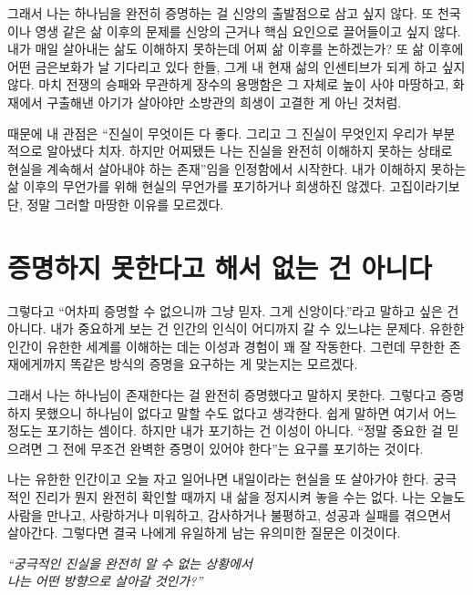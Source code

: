 \documentclass[11pt]{article}
\begin{document}
그래서 나는 하나님을 완전히 증명하는 걸 신앙의 출발점으로 삼고 싶지 않다. 또
천국이나 영생 같은 삶 이후의 문제를 신앙의 근거나 핵심 요인으로 끌어들이고
싶지 않다. 내가 매일 살아내는 삶도 이해하지 못하는데 어찌 삶 이후를 논하겠는가?
또 삶 이후에 어떤 금은보화가 날 기다리고 있다 한들, 그게 내 현재 삶의
인센티브가 되게 하고 싶지 않다. 마치 전쟁의 승패와 무관하게 장수의 용맹함은 그
자체로 높이 사야 마땅하고, 화재에서 구출해낸 아기가 살아야만 소방관의 희생이
고결한 게 아닌 것처럼.

때문에 내 관점은 “진실이 무엇이든 다 좋다. 그리고 그 진실이 무엇인지 우리가
부분적으로 알아냈다 치자. 하지만 어찌됐든 나는 진실을 완전히 이해하지 못하는
상태로 현실을 계속해서 살아내야 하는 존재”임을 인정함에서 시작한다. 내가
이해하지 못하는 삶 이후의 무언가를 위해 현실의 무언가를 포기하거나 희생하진
않겠다. 고집이라기보단, 정말 그러할 마땅한 이유를 모르겠다.

\section{증명하지 못한다고 해서 없는 건 아니다}

그렇다고 “어차피 증명할 수 없으니까 그냥 믿자. 그게 신앙이다.”라고 말하고 싶은
건 아니다. 내가 중요하게 보는 건 인간의 인식이 어디까지 갈 수 있느냐는 문제다.
유한한 인간이 유한한 세계를 이해하는 데는 이성과 경험이 꽤 잘 작동한다. 그런데
무한한 존재에게까지 똑같은 방식의 증명을 요구하는 게 맞는지는 모르겠다.

그래서 나는 하나님이 존재한다는 걸 완전히 증명했다고 말하지 못한다. 그렇다고
증명하지 못했으니 하나님이 없다고 말할 수도 없다고 생각한다. 쉽게 말하면
여기서 어느 정도는 포기하는 셈이다. 하지만 내가 포기하는 건 이성이 아니다.
“정말 중요한 걸 믿으려면 그 전에 무조건 완벽한 증명이 있어야 한다”는 요구를
포기하는 것이다.

나는 유한한 인간이고 오늘 자고 일어나면 내일이라는 현실을 또 살아가야 한다.
궁극적인 진리가 뭔지 완전히 확인할 때까지 내 삶을 정지시켜 놓을 수는 없다.
나는 오늘도 사람을 만나고, 사랑하거나 미워하고, 감사하거나 불평하고, 성공과
실패를 겪으면서 살아간다. 그렇다면 결국 나에게 유일하게 남는 유의미한 질문은
이것이다.
\begin{center}
\itshape “궁극적인 진실을 완전히 알 수 없는 상황에서\\
나는 어떤 방향으로 살아갈 것인가?”
\end{center}

\end{document}
